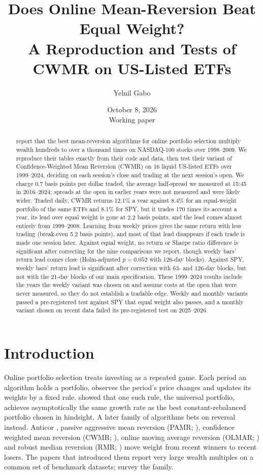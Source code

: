 \documentclass[11pt]{article}
\title{Does Online Mean-Reversion Beat Equal Weight?\\
A Reproduction and Tests of CWMR on US-Listed ETFs}
\author{Yelnil Gabo}
\date{October 8, 2026\\[2pt] \small Working paper}
\begin{document}
\maketitle

\begin{abstract}
\citet{lahanis2025} report that the best mean-reversion algorithms for online portfolio selection
multiply wealth hundreds to over a thousand times on NASDAQ-100 stocks over 1998--2009. We reproduce
their tables exactly from their code and data, then test their variant of Confidence-Weighted
Mean Reversion (CWMR) on 16 liquid US-listed ETFs over 1999--2024, deciding on each session's
close and trading at the next session's open. We charge 0.7 basis points per dollar traded, the
average half-spread we measured at 15:45 in 2016--2024; spreads at the open in earlier years
were not measured and were likely wider. Traded daily, CWMR returns 12.1\% a year against 8.4\%
for an equal-weight portfolio of the same ETFs and 8.1\% for SPY, but it trades 170 times its
account a year, its lead over equal weight is gone at 2.2 basis points, and the lead comes
almost entirely from 1999--2008. Learning from weekly prices gives the same return with less
trading (break-even 5.2 basis points), and most of that lead disappears if each trade is made
one session later. Against equal weight, no return or Sharpe ratio difference is significant
after correcting for the nine comparisons we report, though weekly bars' return lead comes close
(Holm-adjusted $p = 0.052$ with 126-day blocks). Against SPY, weekly bars' return lead is
significant after correction with 63- and 126-day blocks, but not with the 21-day blocks of our
main specification. These 1999--2024 results include the years the weekly variant was chosen on
and assume costs at the open that were never measured, so they do not establish a tradable edge. Weekly and monthly
variants passed a pre-registered test against SPY that equal weight also passes, and a monthly
variant chosen on recent data failed its pre-registered test on 2025--2026.
\end{abstract}

\section{Introduction}

Online portfolio selection treats investing as a repeated game. Each period an algorithm holds
a portfolio, observes the period's price changes and updates its weights by a fixed rule.
\citet{cover1991} showed that one such rule, the universal portfolio, achieves asymptotically
the same growth rate as the best constant-rebalanced portfolio chosen in hindsight. A later family of algorithms bets on reversal instead. Anticor
\citep{borodin2004}, passive aggressive mean reversion (PAMR; \citealp{li2012pamr}),
confidence weighted mean reversion (CWMR; \citealp{li2011cwmr,li2013cwmr}), online moving
average reversion (OLMAR; \citealp{li2015olmar}) and robust median reversion (RMR;
\citealp{huang2013}) move weight from recent winners to recent losers. The papers that introduced
them report very large wealth multiples on a common set of benchmark datasets;
\citet{lihoi2014} survey the family.
\end{document}
